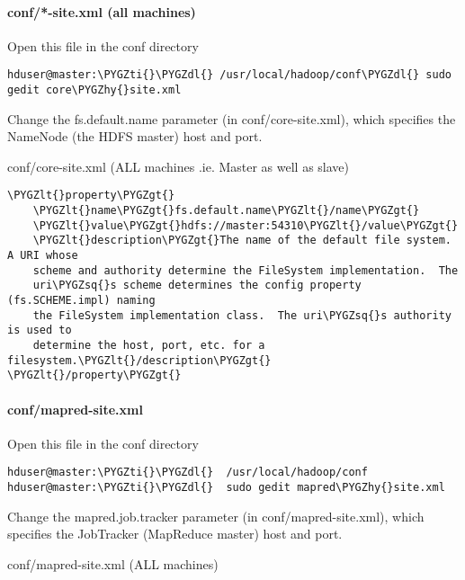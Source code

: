\documentclass[letterpaper,10pt,english]{sphinxmanual}
\def\PYGZlt{\char`\<}
\def\PYGZgt{\char`\>}
\def\PYGZdl{\char`\$}
\def\PYGZhy{\char`\-}
\def\PYGZsq{\char`\'}
\def\PYGZti{\char`\~}
\begin{document}
\paragraph{conf/{\color{red}\bfseries{}*}-site.xml (all machines)}
\label{hadoop:conf-site-xml-all-machines}
Open this file in the conf directory

\begin{Verbatim}[commandchars=\\\{\}]
hduser@master:\PYGZti{}\PYGZdl{} /usr/local/hadoop/conf\PYGZdl{} sudo gedit core\PYGZhy{}site.xml
\end{Verbatim}

Change the fs.default.name parameter (in conf/core-site.xml), which specifies the NameNode (the HDFS master) host and port.

conf/core-site.xml (ALL machines .ie. Master as well as slave)

\begin{Verbatim}[commandchars=\\\{\}]
\PYGZlt{}property\PYGZgt{}
    \PYGZlt{}name\PYGZgt{}fs.default.name\PYGZlt{}/name\PYGZgt{}
    \PYGZlt{}value\PYGZgt{}hdfs://master:54310\PYGZlt{}/value\PYGZgt{}
    \PYGZlt{}description\PYGZgt{}The name of the default file system.  A URI whose
    scheme and authority determine the FileSystem implementation.  The
    uri\PYGZsq{}s scheme determines the config property (fs.SCHEME.impl) naming
    the FileSystem implementation class.  The uri\PYGZsq{}s authority is used to
    determine the host, port, etc. for a filesystem.\PYGZlt{}/description\PYGZgt{}
\PYGZlt{}/property\PYGZgt{}
\end{Verbatim}


\paragraph{conf/mapred-site.xml}
\label{hadoop:conf-mapred-site-xml}
Open this file in the conf directory

\begin{Verbatim}[commandchars=\\\{\}]
hduser@master:\PYGZti{}\PYGZdl{}  /usr/local/hadoop/conf
hduser@master:\PYGZti{}\PYGZdl{}  sudo gedit mapred\PYGZhy{}site.xml
\end{Verbatim}

Change the mapred.job.tracker parameter (in conf/mapred-site.xml), which specifies the JobTracker (MapReduce master) host and port.

conf/mapred-site.xml (ALL machines)
\end{document}
